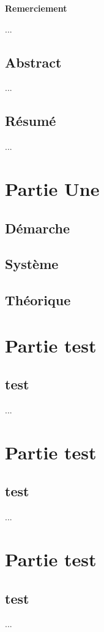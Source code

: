 \documentclass[answers,a4paper,twoside]{School-Work-Template}
\begin{document}

\newpage
\thispagestyle{empty}
\begin{center}
	\textbf{{\Large Remerciement}}
\end{center}
...
\newpage
\thispagestyle{empty}
\section*{Abstract}%
...
\newpage
\thispagestyle{empty}
\section*{Résumé}%
...
\newpage
\tableofcontents


\newpage
\chapter{Partie Une}
\section{Démarche}

\newpage
\section{Système}

\newpage
\section{Théorique}

\newpage
\chapter{Partie test}
\section{test}
...
\chapter{Partie test}
\section{test}
...
\chapter{Partie test}
\section{test}
...
\end{document}
